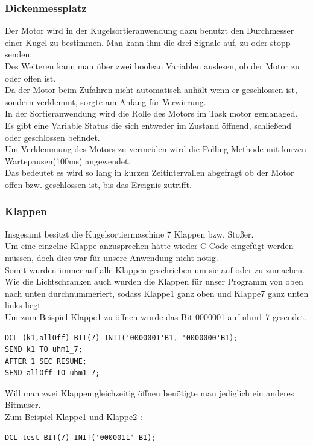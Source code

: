 \documentclass[12pt,a4paper]{article}
\begin{document}
\subsubsection{Dickenmessplatz}
Der Motor wird in der Kugelsortieranwendung dazu benutzt den Durchmesser einer Kugel zu bestimmen. Man kann ihm die drei Signale auf, zu oder stopp senden.\\
Des Weiteren kann man über zwei boolean Variablen auslesen, ob der Motor zu oder offen ist.\\
Da der Motor beim Zufahren nicht automatisch anhält wenn er geschlossen ist, sondern verklemmt, sorgte am Anfang für Verwirrung.\\
In der Sortieranwendung wird die Rolle des Motors im Task motor gemanaged.\\
Es gibt eine Variable Status die sich entweder im Zustand öffnend, schließend oder geschlossen befindet.\\
Um Verklemmung des Motors zu vermeiden wird die Polling-Methode mit kurzen Wartepausen(100ms) angewendet.\\
Das bedeutet es wird so lang in kurzen Zeitintervallen abgefragt ob der Motor offen bzw. geschlossen ist, bis das Ereignis zutrifft.\\
\newpage

\subsubsection{Klappen}
Insgesamt besitzt die Kugelsortiermaschine 7 Klappen bzw. Stoßer.\\
Um eine einzelne Klappe anzusprechen hätte wieder C-Code eingefügt werden müssen, doch dies war für unsere Anwendung nicht nötig.\\
Somit wurden immer auf alle Klappen geschrieben um sie auf oder zu zumachen.\\ 
Wie die Lichtschranken auch wurden die Klappen für unser Programm von oben nach unten durchnummeriert, sodass Klappe1 ganz oben und Klappe7 ganz unten links liegt.\\
Um zum Beispiel Klappe1 zu öffnen wurde das Bit 0000001 auf uhm1-7 gesendet.\\
\begin{lstlisting}
DCL (k1,allOff) BIT(7) INIT('0000001'B1, '0000000'B1);
SEND k1 TO uhm1_7;
AFTER 1 SEC RESUME;
SEND allOff TO uhm1_7;
\end{lstlisting}
Will man zwei Klappen gleichzeitig öffnen benötigte man jediglich ein anderes Bitmuser.\\
Zum Beispiel Klappe1 und Klappe2 :
\begin{lstlisting}
DCL test BIT(7) INIT('0000011' B1);
\end{lstlisting}
\end{document}
